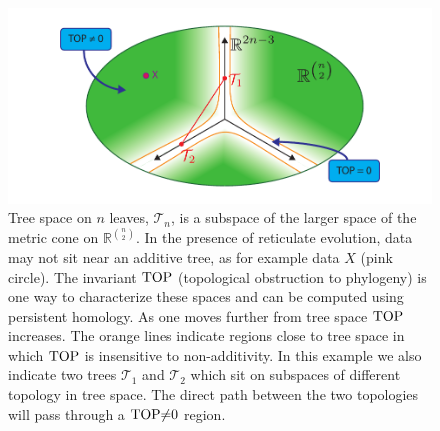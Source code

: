 \begin{figure}
	\centering
	\includegraphics[]{./fig/background/tree_space_revisited_v2.pdf}
	\caption[Topology expands tree space to include reticulation]{Tree space on $n$ leaves, $\mathcal{T}_{n}$, is a subspace of the larger space of the metric cone on $\mathbb{R}^{\binom{n}{2}}$. In the presence of reticulate evolution, data may not sit near an additive tree, as for example data $X$ (pink circle). The invariant $\operatorname{TOP}$ (topological obstruction to phylogeny) is one way to characterize these spaces and can be computed using persistent homology. As one moves further from tree space $\operatorname{TOP}$ increases. The orange lines indicate regions close to tree space in which $\operatorname{TOP}$ is insensitive to non-additivity. In this example we also indicate two trees $\mathcal{T}_{1}$ and $\mathcal{T}_{2}$ which sit on subspaces of different topology in tree space. The direct path between the two topologies will pass through a ${\operatorname{TOP}}{\neq}{0}$ region.}
	\label{fig:bg:tree_space_revisited}
\end{figure}